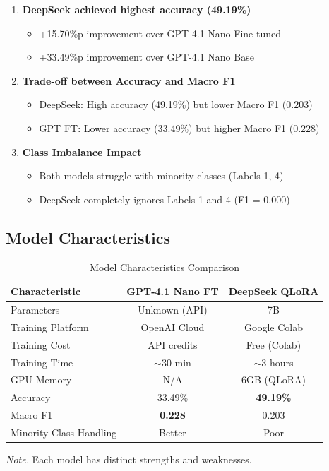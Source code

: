 \documentclass[11pt, a4paper]{article}
\begin{document}
\begin{enumerate}
    \item \textbf{DeepSeek achieved highest accuracy (49.19\%)}
    \begin{itemize}
        \item +15.70\%p improvement over GPT-4.1 Nano Fine-tuned
        \item +33.49\%p improvement over GPT-4.1 Nano Base
    \end{itemize}
    
    \item \textbf{Trade-off between Accuracy and Macro F1}
    \begin{itemize}
        \item DeepSeek: High accuracy (49.19\%) but lower Macro F1 (0.203)
        \item GPT FT: Lower accuracy (33.49\%) but higher Macro F1 (0.228)
    \end{itemize}
    
    \item \textbf{Class Imbalance Impact}
    \begin{itemize}
        \item Both models struggle with minority classes (Labels 1, 4)
        \item DeepSeek completely ignores Labels 1 and 4 (F1 = 0.000)
    \end{itemize}
\end{enumerate}

\subsection{Model Characteristics}

\begin{table}[H]
\centering
\caption{Model Characteristics Comparison}
\label{tab:model_chars}
\begin{tabular}{lcc}
\toprule
\textbf{Characteristic} & \textbf{GPT-4.1 Nano FT} & \textbf{DeepSeek QLoRA} \\
\midrule
Parameters & Unknown (API) & 7B \\
Training Platform & OpenAI Cloud & Google Colab \\
Training Cost & API credits & Free (Colab) \\
Training Time & $\sim$30 min & $\sim$3 hours \\
GPU Memory & N/A & 6GB (QLoRA) \\
Accuracy & 33.49\% & \textbf{49.19\%} \\
Macro F1 & \textbf{0.228} & 0.203 \\
Minority Class Handling & Better & Poor \\
\bottomrule
\end{tabular}

\vspace{0.5em}
\footnotesize\textit{Note.} Each model has distinct strengths and weaknesses.
\end{table}
\end{document}
